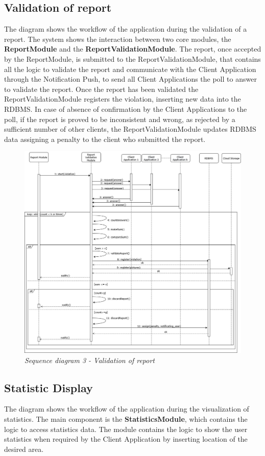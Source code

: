 \subsection{Validation of report}
The diagram shows the workflow of the application during the validation of a report. The system shows the interaction between two core 
modules, the \textbf{ReportModule} and the \textbf{ReportValidationModule}. The report, once accepted by the ReportModule, is submitted to
the ReportValidationModule, that contains all the logic to validate the report and communicate with the Client Application through the Notification
Push, to send all Client Applications the poll to answer to validate the report. Once the report has been validated the ReportValidationModule
registers the violation, inserting new data into the RDBMS. In case of absence of confirmation by the Client Applications to the poll, if the 
report is proved to be inconsistent and wrong, as rejected by a sufficient number of other clients, the ReportValidationModule updates RDBMS data 
assigning a penalty to the client who submitted the report.

\begin{figure}[H]
  \centering
  \includegraphics[origin=c,width=\textwidth]{DD_Images/RunTimeView/3.jpg}
  \caption{\textit{Sequence diagram 3 - Validation of report}}
\end{figure}

\subsection{Statistic Display}
The diagram shows the workflow of the application during the visualization of statistics. The main component is the \textbf{StatisticsModule},
which contains the logic to access statistics data. The module contains the logic to show the user statistics when required by the Client Application
by inserting location of the desired area.

